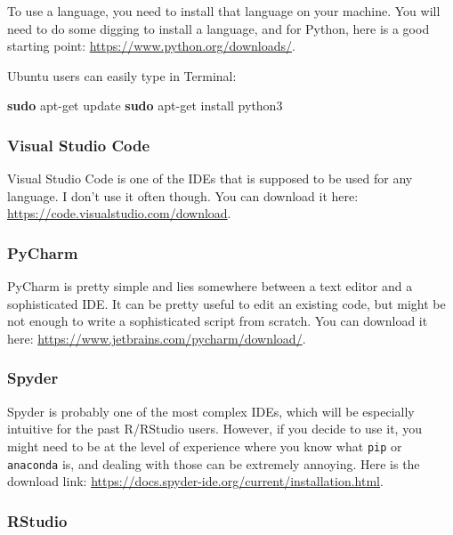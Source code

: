 \documentclass[
  11pt,
]{article}
\newenvironment{Shaded}{\begin{snugshade}}{\end{snugshade}}
\newcommand{\FunctionTok}[1]{\textcolor[rgb]{0.13,0.29,0.53}{\textbf{#1}}}
\newcommand{\NormalTok}[1]{#1}
\begin{document}
To use a language, you need to install that language on your machine. You will need to do some digging to install a language, and for Python, here is a good starting point: \url{https://www.python.org/downloads/}.

Ubuntu users can easily type in Terminal:

\begin{Shaded}
\begin{Highlighting}[]
\FunctionTok{sudo}\NormalTok{ apt{-}get update}
\FunctionTok{sudo}\NormalTok{ apt{-}get install python3}
\end{Highlighting}
\end{Shaded}

\subsubsection{Visual Studio Code}\label{visual-studio-code}

Visual Studio Code is one of the IDEs that is supposed to be used for any language. I don't use it often though. You can download it here: \url{https://code.visualstudio.com/download}.

\subsubsection{PyCharm}\label{pycharm}

PyCharm is pretty simple and lies somewhere between a text editor and a sophisticated IDE. It can be pretty useful to edit an existing code, but might be not enough to write a sophisticated script from scratch. You can download it here: \url{https://www.jetbrains.com/pycharm/download/}.

\subsubsection{Spyder}\label{spyder}

Spyder is probably one of the most complex IDEs, which will be especially intuitive for the past R/RStudio users. However, if you decide to use it, you might need to be at the level of experience where you know what \texttt{pip} or \texttt{anaconda} is, and dealing with those can be extremely annoying. Here is the download link: \url{https://docs.spyder-ide.org/current/installation.html}.

\subsubsection{RStudio}\label{rstudio}
\end{document}
